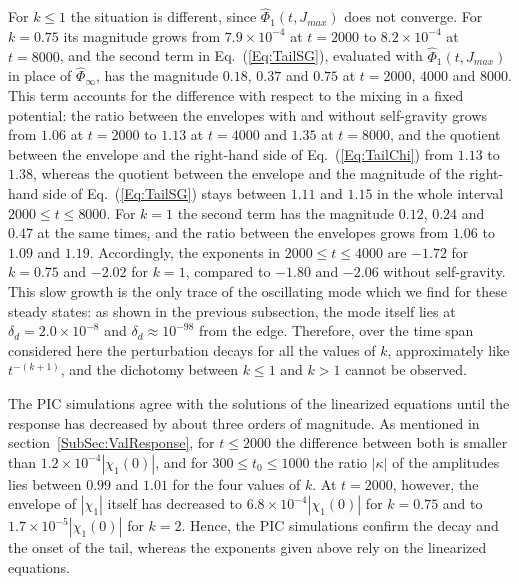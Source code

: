 For $k\leq 1$ the situation is different, since $\hat{\Phi}_1(t,J_{max})$ does not converge. For $k = 0.75$ its magnitude grows from $7.9\times 10^{-4}$ at $t = 2000$ to $8.2\times 10^{-4}$ at $t = 8000$, and the second term in Eq.~(\ref{Eq:TailSG}), evaluated with $\hat{\Phi}_1(t,J_{max})$ in place of $\hat{\Phi}_\infty$, has the magnitude $0.18$, $0.37$ and $0.75$ at $t = 2000$, $4000$ and $8000$. This term accounts for the difference with respect to the mixing in a fixed potential: the ratio between the envelopes with and without self-gravity grows from $1.06$ at $t = 2000$ to $1.13$ at $t = 4000$ and $1.35$ at $t = 8000$, and the quotient between the envelope and the right-hand side of Eq.~(\ref{Eq:TailChi}) from $1.13$ to $1.38$, whereas the quotient between the envelope and the magnitude of the right-hand side of Eq.~(\ref{Eq:TailSG}) stays between $1.11$ and $1.15$ in the whole interval $2000\leq t\leq 8000$. For $k = 1$ the second term has the magnitude $0.12$, $0.24$ and $0.47$ at the same times, and the ratio between the envelopes grows from $1.06$ to $1.09$ and $1.19$. Accordingly, the exponents in $2000\leq t\leq 4000$ are $-1.72$ for $k = 0.75$ and $-2.02$ for $k = 1$, compared to $-1.80$ and $-2.06$ without self-gravity. This slow growth is the only trace of the oscillating mode which we find for these steady states: as shown in the previous subsection, the mode itself lies at $\delta_d = 2.0\times 10^{-8}$ and $\delta_d\approx 10^{-98}$ from the edge. Therefore, over the time span considered here the perturbation decays for all the values of $k$, approximately like $t^{-(k+1)}$, and the dichotomy between $k\leq 1$ and $k > 1$ cannot be observed.

The PIC simulations agree with the solutions of the linearized equations until the response has decreased by about three orders of magnitude. As mentioned in section~\ref{SubSec:ValResponse}, for $t\leq 2000$ the difference between both is smaller than $1.2\times 10^{-4}|\chi_1(0)|$, and for $300\leq t_0\leq 1000$ the ratio $|\kappa|$ of the amplitudes lies between $0.99$ and $1.01$ for the four values of $k$. At $t = 2000$, however, the envelope of $|\chi_1|$ itself has decreased to $6.8\times 10^{-4}|\chi_1(0)|$ for $k = 0.75$ and to $1.7\times 10^{-5}|\chi_1(0)|$ for $k = 2$. Hence, the PIC simulations confirm the decay and the onset of the tail, whereas the exponents given above rely on the linearized equations.

